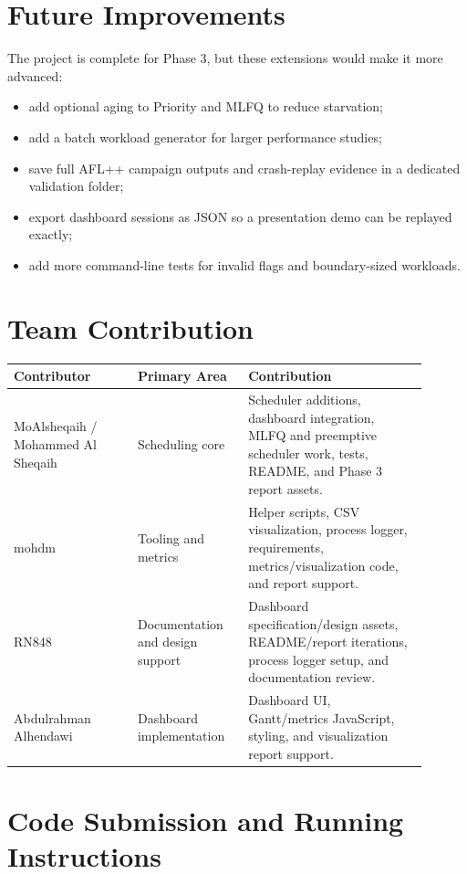 \documentclass[11pt]{article}
\begin{document}
\section{Future Improvements}

The project is complete for Phase 3, but these extensions would make it more
advanced:

\begin{itemize}
  \item add optional aging to Priority and MLFQ to reduce starvation;
  \item add a batch workload generator for larger performance studies;
  \item save full AFL++ campaign outputs and crash-replay evidence in a
  dedicated validation folder;
  \item export dashboard sessions as JSON so a presentation demo can be replayed
  exactly;
  \item add more command-line tests for invalid flags and boundary-sized
  workloads.
\end{itemize}

\section{Team Contribution}

\begin{longtable}{p{0.27\linewidth}p{0.24\linewidth}p{0.39\linewidth}}
\toprule
\textbf{Contributor} & \textbf{Primary Area} & \textbf{Contribution} \\
\midrule
MoAlsheqaih / Mohammed Al Sheqaih & Scheduling core & Scheduler additions,
dashboard integration, MLFQ and preemptive scheduler work, tests, README, and
Phase 3 report assets. \\
mohdm & Tooling and metrics & Helper scripts, CSV visualization, process
logger, requirements, metrics/visualization code, and report support. \\
RN848 & Documentation and design support & Dashboard specification/design
assets, README/report iterations, process logger setup, and documentation
review. \\
Abdulrahman Alhendawi & Dashboard implementation & Dashboard UI,
Gantt/metrics JavaScript, styling, and visualization report support. \\
\bottomrule
\end{longtable}

\section{Code Submission and Running Instructions}
\end{document}

